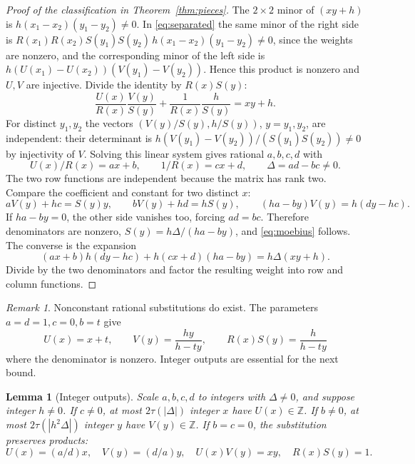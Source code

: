\documentclass[11pt]{article}
\newtheorem{lemma}[theorem]{Lemma}
\theoremstyle{definition}
\newcommand{\Z}{\mathbb Z}
\theoremstyle{remark}
\newtheorem{remark}[theorem]{Remark}
\numberwithin{equation}{section}
\begin{document}
\begin{proof}[Proof of the classification in Theorem~\ref{thm:pieces}]
The $2\times2$ minor of $(xy+h)$ is $h(x_1-x_2)(y_1-y_2)\ne0$.
In \eqref{eq:separated} the same minor of the right side is
$R(x_1)R(x_2)S(y_1)S(y_2)\,h(x_1-x_2)(y_1-y_2)\ne0$, since the weights are nonzero, and the
corresponding minor of the left side is $h(U(x_1)-U(x_2))(V(y_1)-V(y_2))$.
Hence this product is nonzero and $U,V$ are injective.
Divide the identity by $R(x)S(y)$:
\begin{equation}\label{eq:c-rank-decomposition}
 \frac{U(x)}{R(x)}\frac{V(y)}{S(y)}+\frac1{R(x)}\frac h{S(y)}=xy+h.
\end{equation}
For distinct $y_1,y_2$ the vectors $(V(y)/S(y),h/S(y))$, $y=y_1,y_2$, are independent: their
determinant is $h(V(y_1)-V(y_2))/(S(y_1)S(y_2))\ne0$ by injectivity of $V$.
Solving this linear system gives rational $a,b,c,d$ with
\begin{equation}\label{eq:c-linear-rows}
 U(x)/R(x)=ax+b,\qquad1/R(x)=cx+d,\qquad\Delta=ad-bc\ne0.
\end{equation}
The two row functions are independent because the matrix has rank two.
Compare the coefficient and constant for two distinct $x$:
\begin{equation}\label{eq:c-linear-columns}
 aV(y)+hc=S(y)y,\qquad bV(y)+hd=hS(y),\qquad
 (ha-by)V(y)=h(dy-hc).
\end{equation}
If $ha-by=0$, the other side vanishes too, forcing $ad=bc$.
Therefore denominators are nonzero, $S(y)=h\Delta/(ha-by)$, and \eqref{eq:moebius} follows.
The converse is the expansion
\begin{equation}\label{eq:c-moebius-identity}
 (ax+b)h(dy-hc)+h(cx+d)(ha-by)=h\Delta(xy+h).
\end{equation}
Divide by the two denominators and factor the resulting weight into row and column functions.
\end{proof}
\begin{remark}\label{rem:c-rational-shift}
Nonconstant rational substitutions do exist. The parameters $a=d=1,c=0,b=t$ give
\begin{equation}\label{eq:c-rational-shift}
 U(x)=x+t,\qquad V(y)=\frac{hy}{h-ty},\qquad R(x)S(y)=\frac h{h-ty}
\end{equation}
where the denominator is nonzero. Integer outputs are essential for the next bound.
\end{remark}
\begin{lemma}[Integer outputs]\label{lem:c-integer}
Scale $a,b,c,d$ to integers with $\Delta\ne0$, and suppose integer $h\ne0$.
If $c\ne0$, at most $2\tau(|\Delta|)$ integer $x$ have $U(x)\in\Z$.
If $b\ne0$, at most $2\tau(|h^2\Delta|)$ integer $y$ have $V(y)\in\Z$.
If $b=c=0$, the substitution preserves products:
\begin{equation}\label{eq:c-preserved}
 U(x)=(a/d)x,\quad V(y)=(d/a)y,\quad U(x)V(y)=xy,\quad R(x)S(y)=1.
\end{equation}
\end{lemma}
\end{document}
